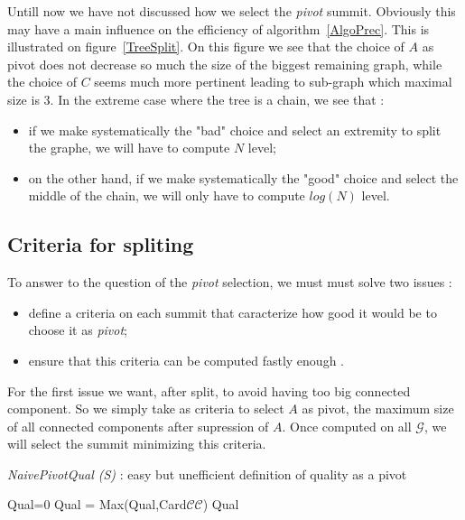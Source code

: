 \documentclass[a4paper]{article}
\begin{document}
Untill now we have not discussed how we select the \emph{pivot} summit.
Obviously this may have a main influence on the efficiency of algorithm~\ref{AlgoPrec}.
This is illustrated on figure~\ref{TreeSplit}. On this figure we see that the
choice of $A$ as pivot does not decrease so much the size of the biggest
remaining graph, while the choice of $C$ seems much more pertinent leading to
sub-graph which maximal size is $3$. In the extreme case where the tree is a chain,
we see that :

\begin{itemize}
    \item if we make systematically the "bad" choice and select an extremity to split
        the graphe, we will have to compute $N$ level;
    \item on the other hand, if we make systematically the "good" choice and select the
        middle of the chain, we will only have to compute $log(N)$ level.
\end{itemize}



\subsection{Criteria for spliting}

To answer to the  question of the \emph{pivot} selection, we must must solve two issues :

\begin{itemize}
   \item define a criteria on each summit that caracterize how good it would be to choose it
       as \emph{pivot};
   \item ensure that this criteria can be computed fastly enough .
\end{itemize}

For the first issue  we want, after split,  to avoid having too big connected
component. So we simply take as criteria to select $A$ as pivot,  the maximum size of all
connected components after supression of $A$. Once computed on all $\mathcal{G}$, we
will select the summit minimizing this criteria.

\begin{algorithm}
\caption{{\it NaivePivotQual (S)} : easy but unefficient definition of quality as a pivot}
\begin{algorithmic}
     \STATE Qual=0  
              \STATE Qual = Max(Qual,Card$\mathcal{CC}$)
     \ENDFOR
     \STATE \RETURN Qual
\end{algorithmic}
\label{AlgoNaivePivot}
\end{algorithm}
\end{document}
